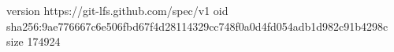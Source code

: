 version https://git-lfs.github.com/spec/v1
oid sha256:9ae776667c6e506fbd67f4d28114329cc748f0a0d4fd054adb1d982c91b4298c
size 174924
